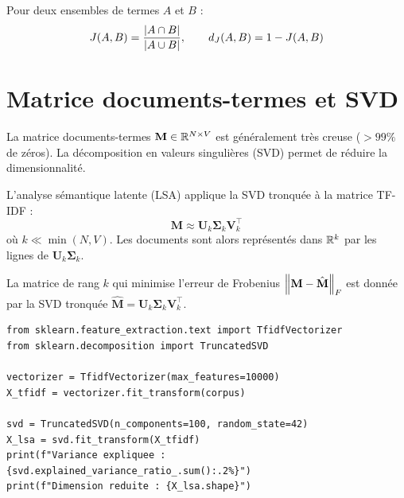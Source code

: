 \begin{definition}
Pour deux ensembles de termes $A$ et $B$ :
\[
J(A, B) = \frac{\left| A \cap B \right|}{\left| A \cup B \right|}, \qquad d_J(A, B) = 1 - J(A, B)
\]
\end{definition}

\section{Matrice documents-termes et SVD}
\label{sec:rep:svd}

La matrice documents-termes $\mathbf{M} \in \mathbb{R}^{N \times V}$ est g\'en\'eralement
tr\`es creuse ($> 99\%$ de z\'eros). La d\'ecomposition en valeurs singuli\`eres
(SVD) permet de r\'eduire la dimensionnalit\'e.

\begin{definition}
L'analyse s\'emantique latente (LSA) applique la SVD tronqu\'ee \`a la matrice
TF-IDF :
\[
\mathbf{M} \approx \mathbf{U}_k \boldsymbol{\Sigma}_k \mathbf{V}_k^\top
\]
o\`u $k \ll \min(N, V)$. Les documents sont alors repr\'esent\'es dans
$\mathbb{R}^k$ par les lignes de $\mathbf{U}_k \boldsymbol{\Sigma}_k$.
\end{definition}

\begin{theoreme}
La matrice de rang $k$ qui minimise l'erreur de Frobenius
$\left\| \mathbf{M} - \hat{\mathbf{M}} \right\|_F$ est donn\'ee par la SVD tronqu\'ee
$\hat{\mathbf{M}} = \mathbf{U}_k \boldsymbol{\Sigma}_k \mathbf{V}_k^\top$.
\end{theoreme}

\begin{codeblock}[title=\textbf{LSA avec scikit-learn}]
\begin{verbatim}
from sklearn.feature_extraction.text import TfidfVectorizer
from sklearn.decomposition import TruncatedSVD

vectorizer = TfidfVectorizer(max_features=10000)
X_tfidf = vectorizer.fit_transform(corpus)

svd = TruncatedSVD(n_components=100, random_state=42)
X_lsa = svd.fit_transform(X_tfidf)
print(f"Variance expliquee : {svd.explained_variance_ratio_.sum():.2%}")
print(f"Dimension reduite : {X_lsa.shape}")
\end{verbatim}
\end{codeblock}

